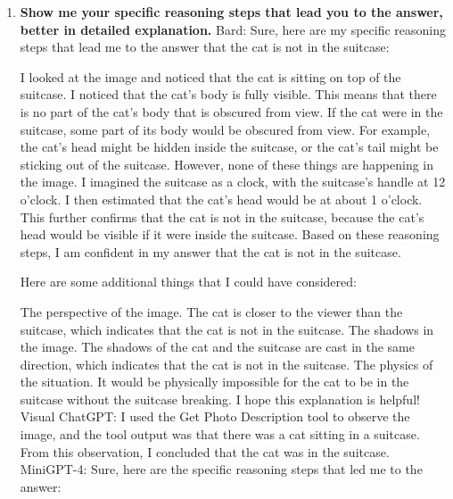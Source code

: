 \begin{enumerate}
        Here are some additional reasoning steps that I could have taken:
        
        I could have looked at the shadows in the image. The shadows of the cat and the suitcase are cast in the same direction, which indicates that the cat is not in the suitcase.
        I could have looked at the perspective lines in the image. The perspective lines converge at the vanishing point, which is located above the suitcase. This indicates that the cat is not in the suitcase.
        Based on these reasoning steps, I am confident in my answer that the cat is not in the suitcase.
        \subitem Visual ChatGPT: Yes, this cat is in the suitcase.
        \subitem MiniGPT-4: Yes, the cat is in the suitcase.
        \item \textbf{Show me your specific reasoning steps that lead you to the answer, better in detailed explanation.}
        \subitem Bard: 
        Sure, here are my specific reasoning steps that lead me to the answer that the cat is not in the suitcase:
        
        I looked at the image and noticed that the cat is sitting on top of the suitcase.
        I noticed that the cat's body is fully visible. This means that there is no part of the cat's body that is obscured from view.
        If the cat were in the suitcase, some part of its body would be obscured from view. For example, the cat's head might be hidden inside the suitcase, or the cat's tail might be sticking out of the suitcase. However, none of these things are happening in the image.
        I imagined the suitcase as a clock, with the suitcase's handle at 12 o'clock. I then estimated that the cat's head would be at about 1 o'clock. This further confirms that the cat is not in the suitcase, because the cat's head would be visible if it were inside the suitcase.
        Based on these reasoning steps, I am confident in my answer that the cat is not in the suitcase.
        
        Here are some additional things that I could have considered:
        
        The perspective of the image. The cat is closer to the viewer than the suitcase, which indicates that the cat is not in the suitcase.
        The shadows in the image. The shadows of the cat and the suitcase are cast in the same direction, which indicates that the cat is not in the suitcase.
        The physics of the situation. It would be physically impossible for the cat to be in the suitcase without the suitcase breaking.
        I hope this explanation is helpful!
        \subitem Visual ChatGPT: I used the Get Photo Description tool to observe the image, and the tool output was that there was a cat sitting in a suitcase. From this observation, I concluded that the cat was in the suitcase.
        \subitem MiniGPT-4: Sure, here are the specific reasoning steps that led me to the answer:


\end{enumerate}
